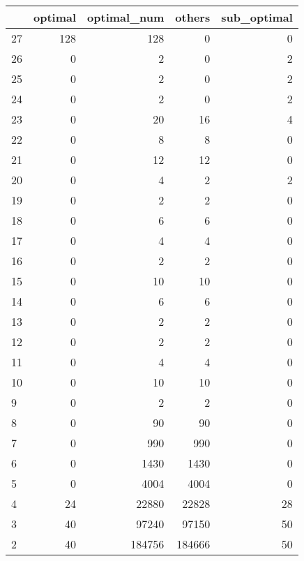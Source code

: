 \begin{tabular}{lrrrr}
\toprule
{} &  optimal &  optimal\_num &  others &  sub\_optimal \\
\midrule
27 &      128 &          128 &       0 &            0 \\
26 &        0 &            2 &       0 &            2 \\
25 &        0 &            2 &       0 &            2 \\
24 &        0 &            2 &       0 &            2 \\
23 &        0 &           20 &      16 &            4 \\
22 &        0 &            8 &       8 &            0 \\
21 &        0 &           12 &      12 &            0 \\
20 &        0 &            4 &       2 &            2 \\
19 &        0 &            2 &       2 &            0 \\
18 &        0 &            6 &       6 &            0 \\
17 &        0 &            4 &       4 &            0 \\
16 &        0 &            2 &       2 &            0 \\
15 &        0 &           10 &      10 &            0 \\
14 &        0 &            6 &       6 &            0 \\
13 &        0 &            2 &       2 &            0 \\
12 &        0 &            2 &       2 &            0 \\
11 &        0 &            4 &       4 &            0 \\
10 &        0 &           10 &      10 &            0 \\
9  &        0 &            2 &       2 &            0 \\
8  &        0 &           90 &      90 &            0 \\
7  &        0 &          990 &     990 &            0 \\
6  &        0 &         1430 &    1430 &            0 \\
5  &        0 &         4004 &    4004 &            0 \\
4  &       24 &        22880 &   22828 &           28 \\
3  &       40 &        97240 &   97150 &           50 \\
2  &       40 &       184756 &  184666 &           50 \\
\bottomrule
\end{tabular}
